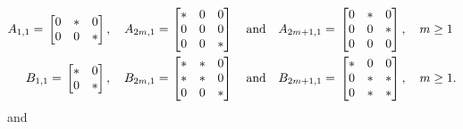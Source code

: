 \documentclass{amsart}
\theoremstyle{remark}
\begin{document}
\begin{align*}
 A_{1,1}  = \, \left[\begin{matrix} 0 & \ast & 0 \\ 0 & 0 & \ast  \end{matrix}\right],
  \quad A_{2m,1}  = & \, \left[\begin{matrix} \ast & 0 & 0 \\ 0 & 0 & 0 \\ 0 & 0 & \ast  \end{matrix}\right] 
\quad \hbox{and}\quad 
A_{2m+1,1}  =  \, \left[\begin{matrix} 0 & \ast & 0 \\ 0 & 0 & \ast \\ 0 & 0 & 0 \end{matrix}\right],\quad m \ge 1 \\
B_{1,1}  =  \, \left[\begin{matrix} \ast & 0 \\ 0 & \ast  \end{matrix}\right], \quad 
B_{2m,1} = & \, \left[\begin{matrix} \ast & \ast & 0 \\ \ast & \ast & 0 \\ 0 & 0 & \ast  \end{matrix}\right]
\quad \hbox{and}\quad 
B_{2m+1,1}  =  \, \left[\begin{matrix} \ast & 0 & 0 \\ 0 & \ast & \ast \\ 0 & \ast & \ast  \end{matrix}\right], \quad m \ge 1. 
\end{align*}
and 
\end{document}
